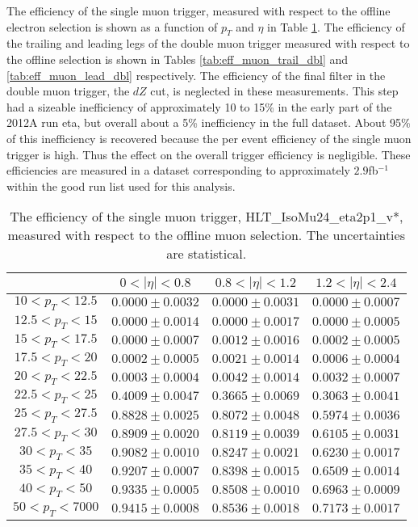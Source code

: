 %
%

The efficiency of the single muon trigger, measured
with respect to the offline electron selection is shown
as a function of $p_T$ and $\eta$ in Table \ref{tab:eff_muon_sgl}.
The efficiency of the trailing and leading legs of the double muon trigger
measured with respect to the offline selection is shown
in Tables \ref{tab:eff_muon_trail_dbl} and \ref{tab:eff_muon_lead_dbl} respectively.
The efficiency of the final filter in the double muon trigger, the $dZ$ cut,
is neglected in these measurements.  This step had a sizeable inefficiency of
approximately 10 to 15\% in the early part of the 2012A run eta, but
overall about a 5\% inefficiency in the full dataset.
About 95\% of this inefficiency is recovered
because the per event efficiency of the single muon trigger is high.
Thus the effect on the overall trigger efficiency is negligible.
These efficiencies are measured in a dataset corresponding
to approximately $2.9$fb$^{-1}$ within the good run list used for this analysis.

\begin{table}[!ht]
\begin{center}
\begin{tabular}{c|c|c|c}
\hline & $0 < |\eta| < 0.8$ & $0.8 < |\eta| < 1.2$ & $1.2 < |\eta| < 2.4$  \\
\hline
$ 10 < p_T < 12.5$ & $0.0000 \pm 0.0032$ & $0.0000 \pm 0.0031$ & $0.0000 \pm 0.0007$  \\
$12.5 < p_T <  15$ & $0.0000 \pm 0.0014$ & $0.0000 \pm 0.0017$ & $0.0000 \pm 0.0005$  \\
$ 15 < p_T < 17.5$ & $0.0000 \pm 0.0007$ & $0.0012 \pm 0.0016$ & $0.0002 \pm 0.0005$  \\
$17.5 < p_T <  20$ & $0.0002 \pm 0.0005$ & $0.0021 \pm 0.0014$ & $0.0006 \pm 0.0004$  \\
$ 20 < p_T < 22.5$ & $0.0003 \pm 0.0004$ & $0.0042 \pm 0.0014$ & $0.0032 \pm 0.0007$  \\
$22.5 < p_T <  25$ & $0.4009 \pm 0.0047$ & $0.3665 \pm 0.0069$ & $0.3063 \pm 0.0041$  \\
$ 25 < p_T < 27.5$ & $0.8828 \pm 0.0025$ & $0.8072 \pm 0.0048$ & $0.5974 \pm 0.0036$  \\
$27.5 < p_T <  30$ & $0.8909 \pm 0.0020$ & $0.8119 \pm 0.0039$ & $0.6105 \pm 0.0031$  \\
$ 30 < p_T <  35$ & $0.9082 \pm 0.0010$ & $0.8247 \pm 0.0021$ & $0.6230 \pm 0.0017$  \\
$ 35 < p_T <  40$ & $0.9207 \pm 0.0007$ & $0.8398 \pm 0.0015$ & $0.6509 \pm 0.0014$  \\
$ 40 < p_T <  50$ & $0.9335 \pm 0.0005$ & $0.8508 \pm 0.0010$ & $0.6963 \pm 0.0009$  \\
$ 50 < p_T < 7000$ & $0.9415 \pm 0.0008$ & $0.8536 \pm 0.0018$ & $0.7173 \pm 0.0017$  \\
\hline
\end{tabular}
\caption{The efficiency of the single muon trigger,
HLT\_IsoMu24\_eta2p1\_v*,
measured with respect to the offline muon selection. 
The uncertainties are statistical.}
\label{tab:eff_muon_sgl}
\end{center}
\end{table}


